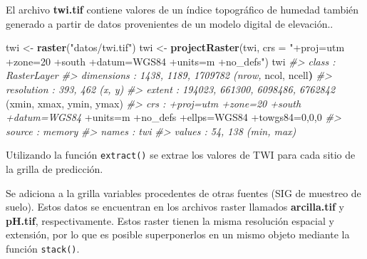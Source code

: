 \documentclass[11pt,b5paper,]{krantz}
\newenvironment{Shaded}{}{}
\newcommand{\CommentTok}[1]{\textcolor[rgb]{0.38,0.63,0.69}{\textit{#1}}}
\newcommand{\DataTypeTok}[1]{\textcolor[rgb]{0.56,0.13,0.00}{#1}}
\newcommand{\DecValTok}[1]{\textcolor[rgb]{0.25,0.63,0.44}{#1}}
\newcommand{\ErrorTok}[1]{\textcolor[rgb]{1.00,0.00,0.00}{\textbf{#1}}}
\newcommand{\KeywordTok}[1]{\textcolor[rgb]{0.00,0.44,0.13}{\textbf{#1}}}
\newcommand{\NormalTok}[1]{#1}
\newcommand{\OperatorTok}[1]{\textcolor[rgb]{0.40,0.40,0.40}{#1}}
\newcommand{\StringTok}[1]{\textcolor[rgb]{0.25,0.44,0.63}{#1}}
\begin{document}
\begin{Shaded}
\end{Shaded}

El archivo \textbf{twi.tif} contiene valores de un índice topográfico de humedad también generado a partir de datos provenientes de un modelo digital de elevación..

\begin{Shaded}
\begin{Highlighting}[]
\NormalTok{twi <-}\StringTok{ }\KeywordTok{raster}\NormalTok{(}\StringTok{"datos/twi.tif"}\NormalTok{)}
\NormalTok{twi <-}
\StringTok{  }\KeywordTok{projectRaster}\NormalTok{(twi, }
                \DataTypeTok{crs =} \StringTok{"+proj=utm +zone=20 +south}
\StringTok{                +datum=WGS84 +units=m +no_defs"}\NormalTok{)}
\NormalTok{twi}
\CommentTok{#> class : RasterLayer}
\CommentTok{#> dimensions : 1438, 1189, 1709782 (nrow,}
\NormalTok{ncol, ncell}\ErrorTok{)}
\CommentTok{#> resolution : 393, 462 (x, y)}
\CommentTok{#> extent : 194023, 661300, 6098486, 6762842}
\NormalTok{(xmin, xmax, ymin, ymax)}
\CommentTok{#> crs : +proj=utm +zone=20 +south +datum=WGS84}
\OperatorTok{+}\NormalTok{units=m }\OperatorTok{+}\NormalTok{no_defs }\OperatorTok{+}\NormalTok{ellps=WGS84 }\OperatorTok{+}\NormalTok{towgs84=}\DecValTok{0}\NormalTok{,}\DecValTok{0}\NormalTok{,}\DecValTok{0}
\CommentTok{#> source : memory}
\CommentTok{#> names : twi}
\CommentTok{#> values : 54, 138 (min, max)}
\end{Highlighting}
\end{Shaded}

Utilizando la función \texttt{extract()} se extrae los valores de TWI para cada sitio de la grilla de predicción.

\begin{Shaded}
\end{Shaded}

Se adiciona a la grilla variables procedentes de otras fuentes (SIG de muestreo de suelo). Estos datos se encuentran en los archivos raster llamados \textbf{arcilla.tif} y \textbf{pH.tif}, respectivamente. Estos raster tienen la misma resolución espacial y extensión, por lo que es posible superponerlos en un mismo objeto mediante la función \texttt{stack()}.
\end{document}

